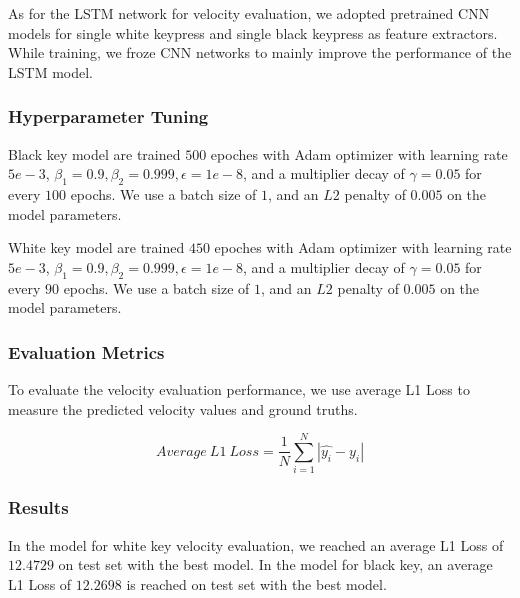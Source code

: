 \documentclass[10pt,twocolumn,letterpaper]{article}
\begin{document}
As for the LSTM network for velocity evaluation, we adopted pretrained CNN models for single white keypress and single black keypress as feature extractors. While training, we froze CNN networks to mainly improve the performance of the LSTM model.

\subsubsection{Hyperparameter Tuning}

Black key model are trained \(500\) epoches with Adam optimizer with learning rate \(5e-3\), \(\beta_1 = 0.9, \beta_2 = 0.999, \epsilon = 1e-8\), and a multiplier decay of \(\gamma=0.05\) for every $100$ epochs. We use a batch size of \(1\), and an \(L2\) penalty of \(0.005\) on the model parameters.

White key model are trained \(450\) epoches with Adam optimizer with learning rate \(5e-3\), \(\beta_1 = 0.9, \beta_2 = 0.999, \epsilon = 1e-8\), and a multiplier decay of \(\gamma=0.05\) for every $90$ epochs. We use a batch size of \(1\), and an \(L2\) penalty of \(0.005\) on the model parameters. 

\subsubsection{Evaluation Metrics}

To evaluate the velocity evaluation performance, we use average L1 Loss to measure the predicted velocity values and ground truths.

\[Average\ L1\ Loss = \frac{1}{N}\sum_{i=1}^{N}|\widehat{y_i} - y_i|\]

\subsubsection{Results}

In the model for white key velocity evaluation, we reached an average L1 Loss of \(12.4729\) on test set with the best model. In the model for black key, an average L1 Loss of \(12.2698\) is reached on test set with the best model.
\end{document}
